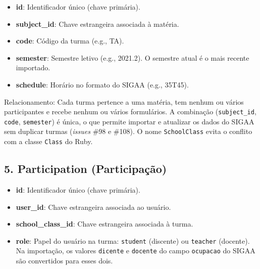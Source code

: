 \documentclass[a4paper,12pt]{article}
\begin{document}
\begin{itemize}

    \item \textbf{id}: Identificador único (chave primária).

    \item \textbf{subject\_id}: Chave estrangeira associada à matéria.

    \item \textbf{code}: Código da turma (e.g., TA).

    \item \textbf{semester}: Semestre letivo (e.g., 2021.2). O semestre atual é o mais recente importado.

    \item \textbf{schedule}: Horário no formato do SIGAA (e.g., 35T45).

\end{itemize}

Relacionamento: Cada turma pertence a uma matéria, tem nenhum ou vários participantes e recebe nenhum ou vários formulários. A combinação (\texttt{subject\_id}, \texttt{code}, \texttt{semester}) é única, o que permite importar e atualizar os dados do SIGAA sem duplicar turmas (\textit{issues} \#98 e \#108). O nome \texttt{SchoolClass} evita o conflito com a classe \texttt{Class} do Ruby.

\subsection*{5. Participation (Participação)}

\begin{itemize}

    \item \textbf{id}: Identificador único (chave primária).

    \item \textbf{user\_id}: Chave estrangeira associada ao usuário.

    \item \textbf{school\_class\_id}: Chave estrangeira associada à turma.

    \item \textbf{role}: Papel do usuário na turma: \texttt{student} (discente) ou \texttt{teacher} (docente). Na importação, os valores \texttt{dicente} e \texttt{docente} do campo \texttt{ocupacao} do SIGAA são convertidos para esses dois.

\end{itemize}
\end{document}
